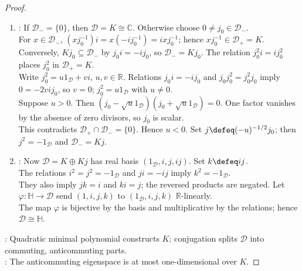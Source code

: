 \begin{theorem}
\begin{proof}
\begin{enumerate}[label=(\roman*)]
The identity $\tau^2=I_{\mathcal{D}}$ holds by $i^2=-1_{\mathcal{D}}$. Set $\mathcal{D}_+\defeq\ker(\tau-I_{\mathcal{D}})$ and $\mathcal{D}_-\defeq\ker(\tau+I_{\mathcal{D}})$. For $x\in\mathcal{D}$, $x=\frac12(x+\tau(x))+\frac12(x-\tau(x))$.\\
The two summands lie in $\mathcal{D}_+$ and $\mathcal{D}_-$, respectively. Since $\mathcal{D}_+\cap\mathcal{D}_-=\{0\}$, $\mathcal{D}=\mathcal{D}_+\oplus\mathcal{D}_-$.\\
Equivalently, $\mathcal{D}_+=\{x\in\mathcal{D}:xi=ix\}$ and $\mathcal{D}_-=\{x\in\mathcal{D}:xi=-ix\}$. The set $\mathcal{D}_+$ is a division subalgebra, and $K\subseteq Z(\mathcal{D}_+)$.\\
For $y\in\mathcal{D}_+$, the map $L_y$ is complex-linear on the finite-dimensional complex space $\mathcal{D}_+$.\\
Choose $\mu\in K$ and $0\neq x\in\mathcal{D}_+$ with $yx=\mu x$ by Theorem \ref{thm:complex-operator-has-eigenvalue}. Since $x^{-1}\in\mathcal{D}_+$, $y=\mu\in K$. Thus $\mathcal{D}_+=K$.
\item {}: If $\mathcal{D}_-=\{0\}$, then $\mathcal{D}=K\cong\mathbb{C}$. Otherwise choose $0\neq j_0\in\mathcal{D}_-$.\\
For $x\in\mathcal{D}_-$, $(xj_0^{-1})i=x(-ij_0^{-1})=ixj_0^{-1}$; hence $xj_0^{-1}\in\mathcal{D}_+=K$.\\
Conversely, $Kj_0\subseteq\mathcal{D}_-$ by $j_0i=-ij_0$, so $\mathcal{D}_-=Kj_0$. The relation $j_0^2i=ij_0^2$ places $j_0^2$ in $\mathcal{D}_+=K$.\\
Write $j_0^2=u1_{\mathcal{D}}+vi$, $u,v\in\mathbb{R}$. Relations $j_0i=-ij_0$ and $j_0j_0^2=j_0^2j_0$ imply $0=-2vij_0$, so $v=0$; $j_0^2=u1_{\mathcal{D}}$ with $u\neq0$.\\
Suppose $u>0$. Then $(j_0-\sqrt{u}1_{\mathcal{D}})(j_0+\sqrt{u}1_{\mathcal{D}})=0$. One factor vanishes by the absence of zero divisors, so $j_0$ is scalar.\\
This contradicts $\mathcal{D}_+\cap\mathcal{D}_-=\{0\}$. Hence $u<0$. Set $j\defeq(-u)^{-1/2}j_0$; then $j^2=-1_{\mathcal{D}}$ and $\mathcal{D}_-=Kj$.
\item {}: Now $\mathcal{D}=K\oplus Kj$ has real basis $(1_{\mathcal{D}},i,j,ij)$. Set $k\defeq ij$.\\
The relations $i^2=j^2=-1_{\mathcal{D}}$ and $ji=-ij$ imply $k^2=-1_{\mathcal{D}}$.\\
They also imply $jk=i$ and $ki=j$; the reversed products are negated. Let $\varphi:\mathbb{H}\to\mathcal{D}$ send $(1,i,j,k)$ to $(1_{\mathcal{D}},i,j,k)$ $\mathbb{R}$-linearly.\\
The map $\varphi$ is bijective by the basis and multiplicative by the relations; hence $\mathcal{D}\cong\mathbb{H}$.
\end{enumerate}
: Quadratic minimal polynomial constructs $K$; conjugation splits $\mathcal{D}$ into commuting, anticommuting parts.\\
: The anticommuting eigenspace is at most one-dimensional over $K$.
\end{proof}
\end{theorem}
